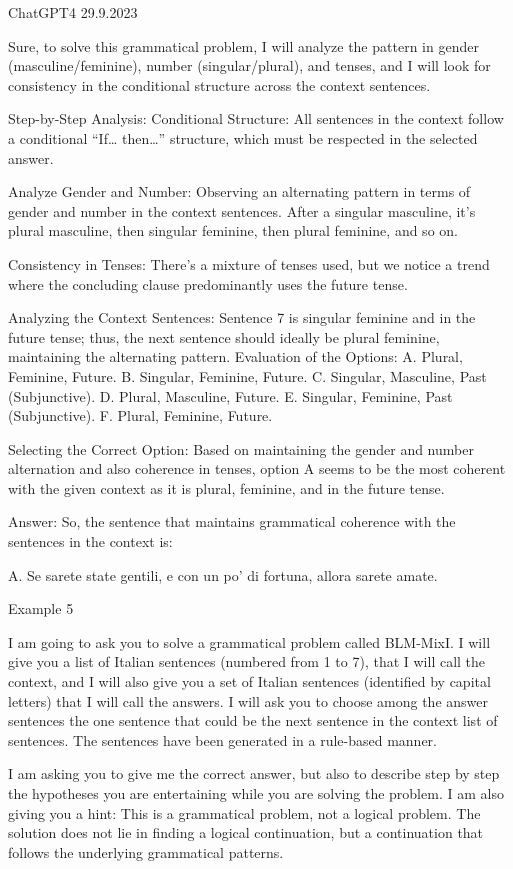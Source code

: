 ChatGPT4 29.9.2023

Sure, to solve this grammatical problem, I will analyze the pattern in gender (masculine/feminine), number (singular/plural), and tenses, and I will look for consistency in the conditional structure across the context sentences.

Step-by-Step Analysis:
Conditional Structure: All sentences in the context follow a conditional “If… then…” structure, which must be respected in the selected answer.

Analyze Gender and Number: Observing an alternating pattern in terms of gender and number in the context sentences. After a singular masculine, it's plural masculine, then singular feminine, then plural feminine, and so on.

Consistency in Tenses: There’s a mixture of tenses used, but we notice a trend where the concluding clause predominantly uses the future tense.

Analyzing the Context Sentences:
Sentence 7 is singular feminine and in the future tense; thus, the next sentence should ideally be plural feminine, maintaining the alternating pattern.
Evaluation of the Options:
A. Plural, Feminine, Future.
B. Singular, Feminine, Future.
C. Singular, Masculine, Past (Subjunctive).
D. Plural, Masculine, Future.
E. Singular, Feminine, Past (Subjunctive).
F. Plural, Feminine, Future.

Selecting the Correct Option:
Based on maintaining the gender and number alternation and also coherence in tenses, option A seems to be the most coherent with the given context as it is plural, feminine, and in the future tense.

Answer:
So, the sentence that maintains grammatical coherence with the sentences in the context is:

A. Se sarete state gentili, e con un po' di fortuna, allora sarete amate.

Example 5

I am going to ask you to solve a grammatical problem called BLM-MixI.  I will give you a list of Italian sentences (numbered from 1 to 7), that I will call the context, and I will also give you a set of Italian sentences (identified by capital letters) that I will call  the answers. I will ask you to choose among the answer sentences the one sentence that could be the next sentence in the context list of sentences. The sentences have been generated in a rule-based manner. 

I am asking you to give me the correct answer, but also to describe step by step  the hypotheses you are entertaining while you are solving the problem.
I am also giving you a hint: This is a grammatical problem, not a logical problem. The solution does not lie in finding a logical continuation, but a continuation that follows the underlying grammatical patterns.



